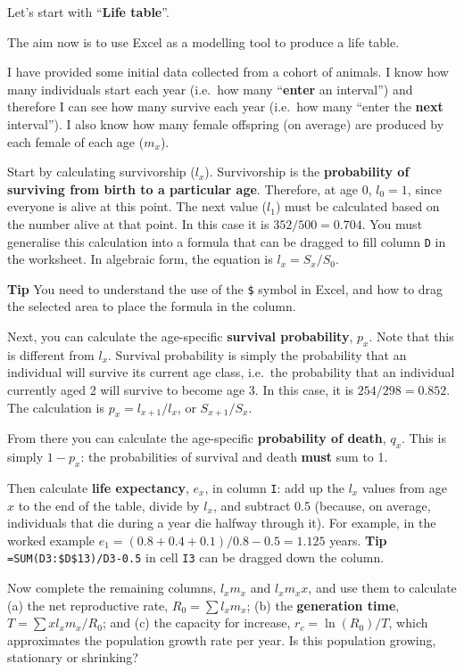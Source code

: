 \documentclass[
  a4paper]{book}
\begin{document}
Let's start with ``\textbf{Life table}''.

The aim now is to use Excel as a modelling tool to produce a life table.

I have provided some initial data collected from a cohort of animals. I know how many individuals start each year (i.e.~how many ``\textbf{enter} an interval'') and therefore I can see how many survive each year (i.e.~how many ``enter the \textbf{next} interval''). I also know how many female offspring (on average) are produced by each female of each age (\(m_x\)).

Start by calculating survivorship (\(l_x\)). Survivorship is the \textbf{probability of surviving from birth to a particular age}. Therefore, at age 0, \(l_0 = 1\), since everyone is alive at this point. The next value (\(l_1\)) must be calculated based on the number alive at that point. In this case it is \(352/500 = 0.704\). You must generalise this calculation into a formula that can be dragged to fill column \texttt{D} in the worksheet. In algebraic form, the equation is \(l_x = S_x/S_0\).

\textbf{Tip} You need to understand the use of the \texttt{\$} symbol in Excel, and how to drag the selected area to place the formula in the column.

Next, you can calculate the age-specific \textbf{survival probability}, \(p_x\). Note that this is different from \(l_x\). Survival probability is simply the probability that an individual will survive its current age class, i.e.~the probability that an individual currently aged 2 will survive to become age 3. In this case, it is \(254/298 = 0.852\). The calculation is \(p_x = l_{x+1}/l_x\), or \(S_{x+1}/S_x\).

From there you can calculate the age-specific \textbf{probability of death}, \(q_x\). This is simply \(1 - p_x\): the probabilities of survival and death \textbf{must} sum to 1.

Then calculate \textbf{life expectancy}, \(e_x\), in column \texttt{I}: add up the \(l_x\) values from age \(x\) to the end of the table, divide by \(l_x\), and subtract 0.5 (because, on average, individuals that die during a year die halfway through it). For example, in the worked example \(e_1 = (0.8 + 0.4 + 0.1)/0.8 - 0.5 = 1.125\) years. \textbf{Tip} \texttt{=SUM(D3:\$D\$13)/D3-0.5} in cell \texttt{I3} can be dragged down the column.

Now complete the remaining columns, \(l_x m_x\) and \(l_x m_x x\), and use them to calculate (a) the net reproductive rate, \(R_0 = \sum l_x m_x\); (b) the \textbf{generation time}, \(T = \sum x l_x m_x / R_0\); and (c) the capacity for increase, \(r_c = \ln(R_0)/T\), which approximates the population growth rate per year. Is this population growing, stationary or shrinking?
\end{document}
